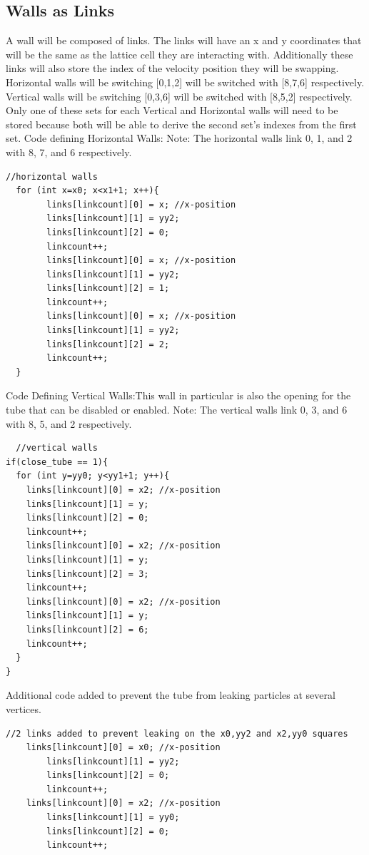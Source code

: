 \documentclass{article}
\begin{document}
\subsection{Walls as Links}
A wall will be composed of links. The links will have an x and y coordinates that will be the same as the lattice cell they are interacting with. Additionally these links will also store the index of the velocity position they will be swapping. Horizontal walls will be switching [0,1,2] will be switched with [8,7,6] respectively. Vertical walls will be switching [0,3,6] will be switched with [8,5,2] respectively. Only one of these sets for each Vertical and Horizontal walls will need to be stored because both will be able to derive the second set's indexes from the first set. 
\vspace{5mm}
Code defining Horizontal Walls:\newline
Note: The horizontal walls link 0, 1, and 2 with 8, 7, and 6 respectively.
\vspace{5mm}
\begin{verbatim}
//horizontal walls
  for (int x=x0; x<x1+1; x++){
    	links[linkcount][0] = x; //x-position
    	links[linkcount][1] = yy2;
    	links[linkcount][2] = 0;
    	linkcount++;
    	links[linkcount][0] = x; //x-position
    	links[linkcount][1] = yy2;
    	links[linkcount][2] = 1;
    	linkcount++;
    	links[linkcount][0] = x; //x-position 
    	links[linkcount][1] = yy2;
    	links[linkcount][2] = 2;
    	linkcount++;
  }
\end{verbatim}
\vspace{5mm}
Code Defining Vertical Walls:\newline This wall in particular is also the opening for the tube that can be disabled or enabled.
Note: The vertical walls link 0, 3, and 6 with 8, 5, and 2 respectively.
\vspace{5mm}
\begin{verbatim}
  //vertical walls
if(close_tube == 1){
  for (int y=yy0; y<yy1+1; y++){
	links[linkcount][0] = x2; //x-position
	links[linkcount][1] = y;
	links[linkcount][2] = 0;
	linkcount++;
	links[linkcount][0] = x2; //x-position
	links[linkcount][1] = y;
	links[linkcount][2] = 3;
	linkcount++;
	links[linkcount][0] = x2; //x-position
	links[linkcount][1] = y;
	links[linkcount][2] = 6;
	linkcount++;
  }
}

\end{verbatim}
\vspace{5mm}
Additional code added to prevent the tube from leaking particles at several vertices.
\vspace{5mm}
\begin{verbatim}
//2 links added to prevent leaking on the x0,yy2 and x2,yy0 squares 
	links[linkcount][0] = x0; //x-position
    	links[linkcount][1] = yy2;
    	links[linkcount][2] = 0;
    	linkcount++;
	links[linkcount][0] = x2; //x-position
    	links[linkcount][1] = yy0;
    	links[linkcount][2] = 0;
    	linkcount++;
\end{verbatim}
\end{document}

